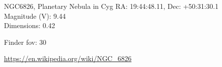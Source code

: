 \begin{block}{NGC6826, Planetary Nebula in Cyg}
    RA: 19:44:48.11, Dec: +50:31:30.1 \\ 
    Magnitude (V): 9.44 \\ 
    Dimensions: 0.42 

    Finder fov: 30 

    \url{https://en.wikipedia.org/wiki/NGC_6826} 
\end{block}